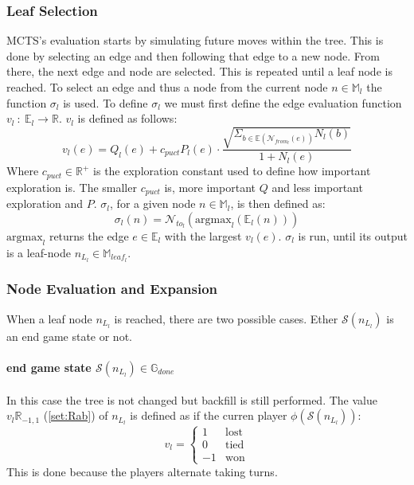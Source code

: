 \documentclass[12pt]{article}
\newcommand{\quckeq}[1]{(\ref{#1})}
\begin{document}
\subsubsection{Leaf Selection} \label{sec:Methods:MCTS:Leaf_selection}
MCTS's evaluation starts by simulating future moves within the tree. This is done by selecting an edge and then following that edge to a new node. From there, the next edge and node are selected. This is repeated until a leaf node is reached. To select an edge and thus a node from the current node \(n\in \mathbb{M}_l\) the function \(\sigma_l\) is used. To define \(\sigma_l\) we must first define the edge evaluation function \(v_l~:~\mathbb{E}_{l}\to\mathbb{R}\). \(v_l\) is defined as follows:
\begin{equation}
v_l(e) = Q_l(e) + c_{puct}P_l(e)\cdot\frac{\sqrt{\Sigma_{b\in\mathbb{E}(\mathcal{N}_{from_l}(e))}N_l(b)}}{1+N_l(e)}
\end{equation}
Where \(c_{puct}\in \mathbb{R}^+\) is the exploration constant used to define how important exploration is. The smaller \(c_{puct}\) is, more important \(Q\) and less important exploration and \(P\). \(\sigma_l\), for a given node \(n\in\mathbb{M}_l\), is then defined as:
\begin{equation}\label{eq:sigma}
\sigma_l(n) = \mathcal{N}_{to_l}(\text{argmax}_l(\mathbb{E}_l(n)))
\end{equation}
\(\text{argmax}_l\) returns the edge \(e \in\mathbb E_l\) with the largest \(v_l(e)\).
\(\sigma_l\) is run, until its output is a leaf-node \(n_{L_l}\in\mathbb{M}_{leaf_l}\).
\subsubsection{Node Evaluation and Expansion}
\label{sec:Methods:MCTS:Node Evaluation and Expansion}
When a leaf node \(n_{L_l}\) is reached, there are two possible cases. Ether \(\mathcal S(n_{L_l})\) is an end game state or not.
\paragraph{end game state \(\mathcal S(n_{L_l}) \in \mathbb G_{done}\)}
In this case the tree is not changed but backfill is still performed. The value \(v_l \mathbb R_{-1,1}\) \quckeq{set:Rab} of \(n_{L_l}\) is defined as if the curren player \(\phi(\mathcal S(n_{L_l}))\):
\begin{equation}
v_l = \left\{\begin{matrix}
1 &  \text{lost}\\
0 & \text{tied}\\
-1 & \text{won}
\end{matrix}\right.
\end{equation}
This is done because the players alternate taking turns.
\end{document}
